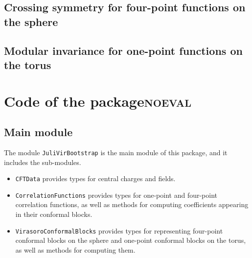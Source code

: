\documentclass[a4paper]{article}
\numberwithin{equation}{section}
\begin{document}
\subsection{Crossing symmetry for four-point functions on the sphere}
\label{sec:org8b7f227}

\subsection{Modular invariance for one-point functions on the torus}
\label{sec:org6624903}
\section{Code of the package\hfill{}\textsc{noeval}}
\label{sec:orgaf4743d}

\subsection{Main module}
\label{sec:orga85c686}
The module \texttt{JuliVirBootstrap} is the main module of this package, and it includes the sub-modules.

\begin{itemize}
\item \texttt{CFTData} provides types for central charges and fields.
\item \texttt{CorrelationFunctions} provides types for one-point and four-point correlation functions, as well as methods for computing coefficients appearing in their conformal blocks.
\item \texttt{VirasoroConformalBlocks} provides types for representing four-point conformal blocks on the sphere and one-point conformal blocks on the torus, as well as methods for computing them.
\end{itemize}
\end{document}
